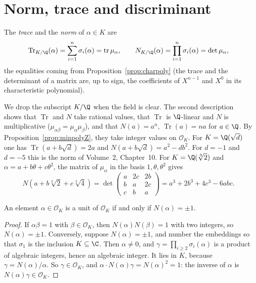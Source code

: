\section{Norm, trace and discriminant}

\begin{definition}
The \emph{trace} and the \emph{norm} of $\alpha\in K$ are
\[
\operatorname{Tr}_{K/\Q}(\alpha)=\sum_{i=1}^n\sigma_i(\alpha)=\operatorname{tr}\mu_\alpha,\qquad
N_{K/\Q}(\alpha)=\prod_{i=1}^n\sigma_i(\alpha)=\det\mu_\alpha,
\]
the equalities coming from Proposition~\ref{prop:charpoly} (the trace and the determinant of a matrix are, up to sign,
the coefficients of $X^{n-1}$ and $X^0$ in its characteristic polynomial).
\end{definition}

We drop the subscript $K/\Q$ when the field is clear. The second description shows that $\operatorname{Tr}$ and $N$
take rational values, that $\operatorname{Tr}$ is $\Q$-linear and $N$ is multiplicative ($\mu_{\alpha\beta}=
\mu_\alpha\mu_\beta$), and that $N(a)=a^n$, $\operatorname{Tr}(a)=na$ for $a\in\Q$. By
Proposition~\ref{prop:minpolyZ}, they take integer values on $\mathcal O_K$. For $K=\Q(\sqrt d)$ one has
$\operatorname{Tr}(a+b\sqrt d)=2a$ and $N(a+b\sqrt d)=a^2-db^2$. For $d=-1$ and $d=-5$ this is the norm of Volume~2, Chapter~10. For $K=\Q(\sqrt[3]2)$ and $\alpha=a+b\theta+c\theta^2$,
the matrix of $\mu_\alpha$ in the basis $1,\theta,\theta^2$ gives
\[
N(a+b\sqrt[3]2+c\sqrt[3]4)=\det\begin{pmatrix}a&2c&2b\\b&a&2c\\c&b&a\end{pmatrix}=a^3+2b^3+4c^3-6abc.
\]

\begin{proposition}\label{prop:units}
An element $\alpha\in\mathcal O_K$ is a unit of $\mathcal O_K$ if and only if $N(\alpha)=\pm1$.
\end{proposition}
\begin{proof}
If $\alpha\beta=1$ with $\beta\in\mathcal O_K$, then $N(\alpha)N(\beta)=1$ with two integers, so $N(\alpha)=\pm1$.
Conversely, suppose $N(\alpha)=\pm1$, and number the embeddings so that $\sigma_1$ is the inclusion $K\subseteq\C$.
Then $\alpha\ne0$, and $\gamma=\prod_{i\ge2}\sigma_i(\alpha)$ is a product of algebraic integers, hence an algebraic
integer. It lies in $K$, because $\gamma=N(\alpha)/\alpha$. So $\gamma\in\mathcal O_K$, and $\alpha\cdot N(\alpha)\gamma=
N(\alpha)^2=1$: the inverse of $\alpha$ is $N(\alpha)\gamma\in\mathcal O_K$.
\end{proof}

